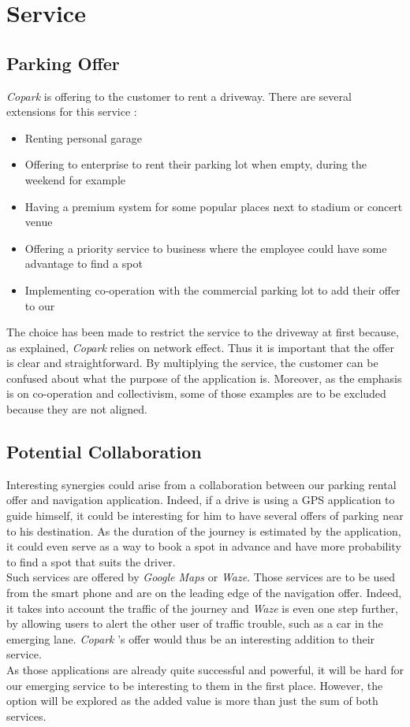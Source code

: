 \documentclass[12pt,a4paper,oneside]{book}
\newcommand{\bp}{\textit{Copark }}
\begin{document}
\section{Service}
\subsection{Parking Offer}
\bp is offering to the customer to rent a driveway. There are several extensions for this service :
\begin{itemize}
\item Renting personal garage
\item Offering to enterprise to rent their parking lot when empty, during the weekend for example
\item Having a premium system for some popular places next to stadium or concert venue
\item Offering a priority service to business where the employee could have some advantage to find a spot
\item Implementing co-operation with the commercial parking lot to add their offer to our
\end{itemize} 
The choice has been made to restrict the service to the driveway at first because, as explained, \bp relies on network effect. Thus it is important that the offer is clear and straightforward. By multiplying the service, the customer can be confused about what the purpose of the application is. Moreover, as the emphasis is on co-operation and collectivism, some of those examples are to be excluded because they are not aligned.

\subsection{Potential Collaboration}
Interesting synergies could arise from a collaboration between our parking rental offer and navigation application. Indeed, if a drive is using a GPS application to guide himself, it could be interesting for him to have several offers of parking near to his destination. As the duration of the journey is estimated by the application, it could even serve as a way to book a spot in advance and have more probability to find a spot that suits the driver.\\
Such services are offered by \textit{Google Maps} or \textit{Waze}. Those services are to be used from the smart phone and are on the leading edge of the navigation offer. Indeed, it takes into account the traffic of the journey and \textit{Waze} is even one step further, by allowing users to alert the other user of traffic trouble, such as a car in the emerging lane. \bp's offer would thus be an interesting addition to their service.\\
As those applications are already quite successful and powerful, it will be hard for our emerging service to be interesting to them in the first place. However, the option will be explored as the added value is more than just the sum of both services.\\
\end{document}

